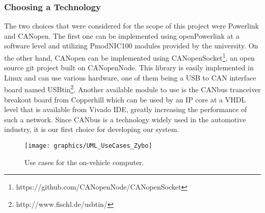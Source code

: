 \subsubsection{Choosing a Technology}
The two choices that were considered for the scope of this project were Powerlink and CANopen.
The first one can be implemented using openPowerlink at a software level and utilizing PmodNIC100 modules provided by the university.
On the other hand, CANopen can be implemented using CANopenSocket\footnote{https://github.com/CANopenNode/CANopenSocket}, an open source git project built on CANopenNode.
This library is easily implemented in Linux and can use various hardware, one of them being a USB to CAN interface board named USBtin\footnote{http://www.fischl.de/usbtin/}.
Another available module to use is the CANbus tranceiver breakout board from Copperhill which can be used by an IP core at a VHDL level that is available from Vivado IDE, greatly increasing the performance of such a network.
Since CANbus is a technology widely used in the automotive industry, it is our first choice for developing our system.

\begin{figure}
\caption{Use cases for the on-vehicle computer.}
\texttt{[image: graphics/UML\_UseCases\_Zybo]}
\end{figure}

